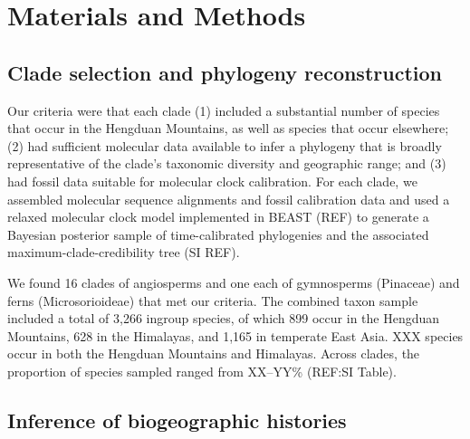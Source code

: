 \section{Materials and Methods}

\subsection{Clade selection and phylogeny reconstruction}

Our criteria were that each clade (1) included a substantial number of species that occur in the Hengduan Mountains, as well as species that occur elsewhere; (2) had sufficient molecular data available to infer a phylogeny that is broadly representative of the clade's taxonomic diversity and geographic range; and (3) had fossil data suitable for molecular clock calibration. For each clade, we assembled molecular sequence alignments and fossil calibration data and used a relaxed molecular clock model implemented in BEAST (REF) to generate a Bayesian posterior sample of time-calibrated phylogenies and the associated maximum-clade-credibility tree (SI REF).

We found 16 clades of angiosperms and one each of gymnosperms (Pinaceae) and ferns (Microsorioideae) that met our criteria. The combined taxon sample included a total of 3,266 ingroup species, of which 899 occur in the Hengduan Mountains, 628 in the Himalayas, and 1,165 in temperate East Asia. XXX species occur in both the Hengduan Mountains and Himalayas. Across clades, the proportion of species sampled ranged from XX--YY\% (REF:SI Table).%

\subsection{Inference of biogeographic histories}

